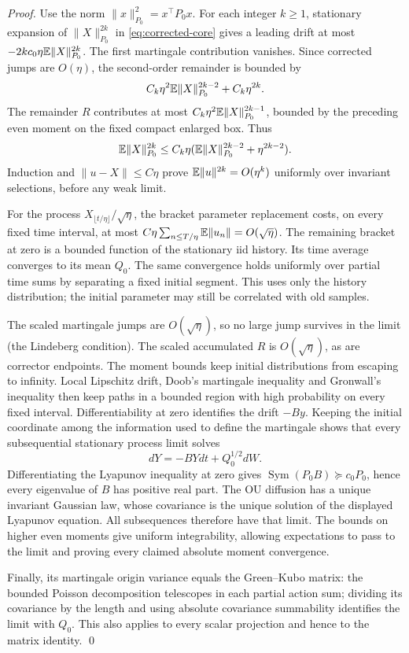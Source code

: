 \begin{proof}
Use the norm $\|x\|_{P_0}^2=x^\top P_0x$. For each integer $k\geq1$,
stationary expansion of $\|X\|_{P_0}^{2k}$ in
\eqref{eq:corrected-core} gives a leading drift at most
$-2kc_0\eta\mathbb E\|X\|_{P_0}^{2k}$. The first martingale contribution
vanishes. Since corrected jumps are $O(\eta)$, the second-order remainder
is bounded by
\[
 C_k\eta^2\mathbb E\|X\|_{P_0}^{2k-2}+C_k\eta^{2k}.
\]
The remainder $R$ contributes at most
$C_k\eta^2\mathbb E\|X\|_{P_0}^{2k-1}$, bounded by the preceding even moment
on the fixed compact enlarged box. Thus
\[
 \mathbb E\|X\|_{P_0}^{2k}\leq C_k\eta
    (\mathbb E\|X\|_{P_0}^{2k-2}+\eta^{2k-2}).
\]
Induction and $\|u-X\|\leq C\eta$ prove
$\mathbb E\|u\|^{2k}=O(\eta^k)$ uniformly over invariant selections, before
any weak limit.

For the process $X_{\lfloor t/\eta\rfloor}/\sqrt\eta$, the bracket
parameter replacement costs, on every fixed time interval, at most
$C\eta\sum_{n\leq T/\eta}\mathbb E\|u_n\|=O(\sqrt\eta)$.
The remaining bracket at zero is a bounded function of the stationary iid
history. Its time average converges to its mean $Q_0$. The same convergence
holds uniformly over partial time sums by separating a fixed initial
segment. This uses only the history distribution; the initial parameter
may still be correlated with old samples.

The scaled martingale jumps are $O(\sqrt\eta)$, so no large jump survives
in the limit (the Lindeberg condition).
The scaled accumulated $R$ is $O(\sqrt\eta)$, as are corrector endpoints.
The moment bounds keep initial distributions from escaping to infinity.
Local Lipschitz drift, Doob's martingale inequality and Gronwall's inequality
then keep paths in a bounded region with high probability on every fixed
interval.
Differentiability at zero identifies the drift $-By$. Keeping the initial coordinate among the information used to define the
martingale shows that every subsequential stationary process limit solves
\[
 dY=-BYdt+Q_0^{1/2}dW.
\]
Differentiating the Lyapunov inequality at zero gives
$\operatorname{Sym}(P_0B)\succeq c_0P_0$, hence every eigenvalue of $B$
has positive real part. The OU diffusion has a unique invariant Gaussian
law, whose covariance is the unique solution of the displayed Lyapunov
equation. All subsequences therefore have that limit. The bounds on higher even moments give uniform integrability, allowing
expectations to pass to the limit and proving every claimed absolute
moment convergence.

Finally, its martingale origin variance equals the Green--Kubo matrix:
the bounded Poisson decomposition telescopes in each partial action sum;
dividing its covariance by the length and using absolute covariance
summability identifies the limit with $Q_0$. This also applies to every
scalar projection and hence to the matrix identity.
\qed\end{proof}
